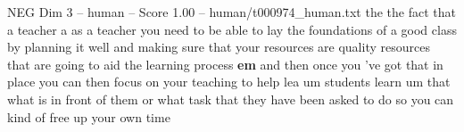 \begin{textsample}{NEG Dim 3 – human – Score 1.00 – human/t000974\_human.txt}  \label{ex:f3_neg_040}
the the fact that a teacher a as a teacher you need to be able to lay the foundations of a good class by planning it well and making sure that your resources are quality resources that are going to aid the learning process \textbf{em} and then once you 've got that in place you can then focus on your teaching to help lea um students learn um that what is in front of them or what task that they have been asked to do so you can kind of free up your own time

\end{textsample}
